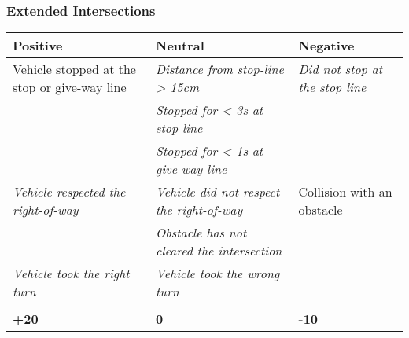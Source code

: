 {	\subsubsection*{Extended Intersections}
	\begin{table}[H]
		\begin{tabularx}{\textwidth}{XXX}
			\toprule
			\textbf{Positive}                                           & \textbf{Neutral}                                                   & \textbf{Negative}                                      \\
			\midrule
			Vehicle stopped at the stop or give-way line                & \textit{Distance from stop-line > 15cm}\footnotemark[1]            & \textit{Did not stop at the stop line}\footnotemark[1] \\
			                                                            & \textit{Stopped for < 3s at stop line}\footnotemark[1]             &                                                        \\
			                                                            & \textit{Stopped for < 1s at give-way line}\footnotemark[3]         &                                                        \\
			\textit{Vehicle respected the right-of-way}\footnotemark[2] & \textit{Vehicle did not respect the right-of-way}\footnotemark[2]  & Collision with an obstacle                             \\
			                                                            & \textit{Obstacle has not cleared the intersection}\footnotemark[2] &                                                        \\
			\textit{Vehicle took the right turn}\footnotemark[4]        & \textit{Vehicle took the wrong turn}\footnotemark[4]               &                                                        \\
			                                                            &                                                                    &                                                        \\
			\topstrut
			\textbf{+20}                                                & \textbf{0}                                                         & \textbf{-10}                                           \\
			\bottomrule
		\end{tabularx}
	\end{table}

}
